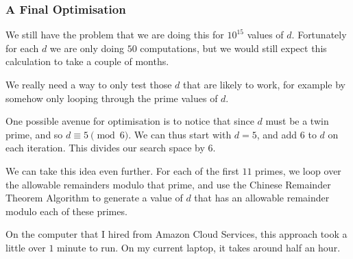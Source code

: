 \documentclass{beamer}
\begin{document}
\begin{frame}

	\frametitle{A Final Optimisation}

	We still have the problem that we are doing this for $10^{15}$ values of $d$. Fortunately for each $d$ we are only doing $50$ computations, but we would still expect this calculation to take a couple of months. \pause

	We really need a way to only test those $d$ that are likely to work, for example by somehow only looping through the prime values of $d$. \pause

	One possible avenue for optimisation is to notice that since $d$ must be a twin prime, and so $d \equiv 5 \pmod 6$. We can thus start with $d = 5$, and add $6$ to $d$ on each iteration. This divides our search space by $6$. \pause

	We can take this idea even further. For each of the first $11$ primes, we loop over the allowable remainders modulo that prime, and use the Chinese Remainder Theorem Algorithm to generate a value of $d$ that has an allowable remainder modulo each of these primes. \pause

	On the computer that I hired from Amazon Cloud Services, this approach took a little over $1$ minute to run. On my current laptop, it takes around half an hour.

\end{frame}
\end{document}
